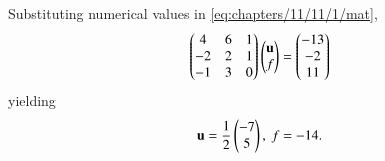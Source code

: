 Substituting numerical values in 
	\eqref{eq:chapters/11/11/1/mat},
\begin{align}
	\label{eq:vertex_system}
	\begin{pmatrix}4&6&1\\-2& 2&1\\-1& 3&0\end{pmatrix}\begin{pmatrix}\mathbf{u}\\f\end{pmatrix} = \begin{pmatrix}-13\\-2 \\11\end{pmatrix}
\end{align}
yielding
\begin{align}
	\mathbf{u}=\frac{1}{2}\begin{pmatrix}-7 \\5\end{pmatrix},\
f=-14.
\end{align}

